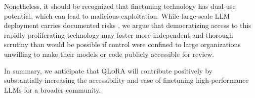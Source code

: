 Nonetheless, it should be recognized that finetuning technology has dual-use potential, which can lead to malicious exploitation. While large-scale LLM deployment carries documented risks \citep{bommasani2021opportunities,bender2021dangers}, we argue that democratizing access to this rapidly proliferating technology may foster more independent and thorough scrutiny than would be possible if control were confined to large organizations unwilling to make their models or code publicly accessible for review.

In summary, we anticipate that \textsc{QLoRA} will contribute positively by substantially increasing the accessibility and ease of finetuning high-performance LLMs for a broader community.
